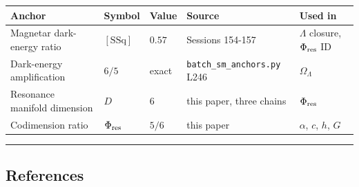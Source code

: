 \documentclass[
]{article}
\newcounter{none} %
\begin{document}
{\def\LTcaptype{none} %
\begin{longtable}[]{@{}
  >{\raggedright\arraybackslash}p{}
  >{\raggedright\arraybackslash}p{}
  >{\raggedleft\arraybackslash}p{}
  >{\raggedright\arraybackslash}p{}
  >{\raggedright\arraybackslash}p{}@{}}
\toprule\noalign{}
\begin{minipage}[b]{\linewidth}\raggedright
Anchor
\end{minipage} & \begin{minipage}[b]{\linewidth}\raggedright
Symbol
\end{minipage} & \begin{minipage}[b]{\linewidth}\raggedleft
Value
\end{minipage} & \begin{minipage}[b]{\linewidth}\raggedright
Source
\end{minipage} & \begin{minipage}[b]{\linewidth}\raggedright
Used in
\end{minipage} \\
\midrule\noalign{}
\endhead
\bottomrule\noalign{}
\endlastfoot
Magnetar dark-energy ratio & \([\mathrm{SSq}]\) & \(0.57\) & Sessions
154-157 & \(\Lambda\) closure, \(\Phi_{\rm res}\) ID \\
Dark-energy amplification & \(6/5\) & exact &
\texttt{batch\_sm\_anchors.py} L246 & \(\Omega_\Lambda\) \\
Resonance manifold dimension & \(D\) & \(6\) & this paper, three chains
& \(\Phi_{\rm res}\) \\
Codimension ratio & \(\Phi_{\rm res}\) & \(5/6\) & this paper &
\(\alpha\), \(c\), \(h\), \(G\) \\
\end{longtable}
}

\begin{center}\rule{0.5\linewidth}{0.5pt}\end{center}

\subsection{References}\label{references}
\end{document}
